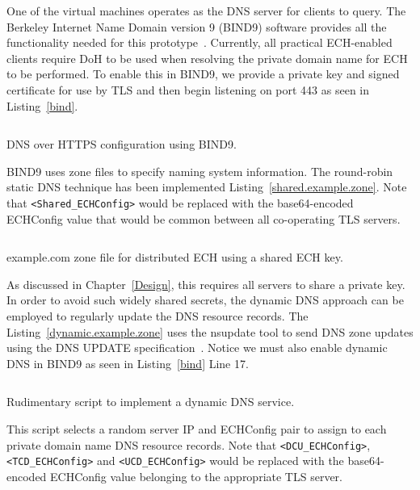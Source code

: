 One of the virtual machines operates as the DNS server for clients to query. The Berkeley Internet Name Domain version 9 (BIND9) software provides all the functionality needed for this prototype~\cite{nathan1berkeley}. Currently, all practical ECH-enabled clients require DoH to be used when resolving the private domain name for ECH to be performed. To enable this in BIND9, we provide a private key and signed certificate for use by TLS and then begin listening on port 443 as seen in Listing~\ref{bind}.

\begin{listing}[ht]
\inputminted{bash}{snippets/bind}
\caption[DNS over HTTPS configuration using BIND9]{DNS over HTTPS configuration using BIND9.}
\label{bind}
\end{listing}

BIND9 uses zone files to specify naming system information. The round-robin static DNS technique has been implemented Listing~\ref{shared.example.zone}. Note that \verb|<Shared_ECHConfig>| would be replaced with the base64-encoded ECHConfig value that would be common between all co-operating TLS servers.

\begin{listing}[ht]
\inputminted{zone}{snippets/shared.example.zone}
\caption[example.com zone file for distributed ECH using a shared ECH key]{example.com zone file for distributed ECH using a shared ECH key.}
\label{shared.example.zone}
\end{listing}

As discussed in Chapter~\ref{Design}, this requires all servers to share a private key. In order to avoid such widely shared secrets, the dynamic DNS approach can be employed to regularly update the DNS resource records. The Listing~\ref{dynamic.example.zone} uses the nsupdate tool to send DNS zone updates using the DNS UPDATE specification~\cite{rfc2136}. Notice we must also enable dynamic DNS in BIND9 as seen in Listing~\ref{bind} Line 17.

\begin{listing}[ht]
\inputminted{bash}{snippets/dynamic.example.zone.bash}
\caption[Rudimentary script to implement a dynamic DNS service]{Rudimentary script to implement a dynamic DNS service.}
\label{dynamic.example.zone}
\end{listing}

This script selects a random server IP and ECHConfig pair to assign to each private domain name DNS resource records. Note that \verb|<DCU_ECHConfig>|, \verb|<TCD_ECHConfig>| and \verb|<UCD_ECHConfig>| would be replaced with the base64-encoded ECHConfig value belonging to the appropriate TLS server.











